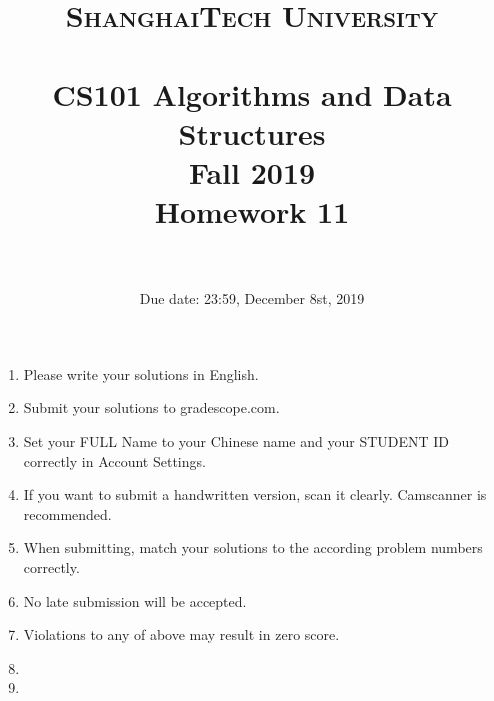 \documentclass{article}
\title{
    \normalfont \normalsize
    \textsc{ShanghaiTech University} \\ [25pt]
    \horrule{0.5pt} \\[0.4cm] %
    \huge CS101 Algorithms and Data Structures\\ %
    \LARGE Fall 2019\\
    \LARGE Homework 11\\
    \horrule{2pt} \\[0.5cm] %
}
\author{}
\date{Due date: 23:59, December 8st, 2019}
\begin{document}
\maketitle
\thispagestyle{firstpage}
\vspace{3ex}

\begin{enumerate}
\item Please write your solutions in English. 

\item Submit your solutions to gradescope.com.  

\item Set your FULL Name to your Chinese name and your STUDENT ID correctly in Account Settings. 

\item If you want to submit a handwritten version, scan it clearly. Camscanner is recommended. 

\item When submitting, match your solutions to the according problem numbers correctly. 

\item No late submission will be accepted.

\item Violations to any of above may result in zero score. 

\item {\large\color{red}{In this homework, all the algorithm design part need the four part proof. The demand is in the next page. If you do not use the four part proof, you will not get any point.}}

\item {\large\color{red}{In the algorithm design problem, you should design the correct algorithm whose running time is equal or smaller than the correct answer. If it's larger than the correct answer, you cannot get any point.}}

\end{enumerate}
\newpage
\end{document}
